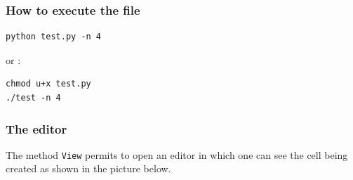 \subsubsection{How to execute the file}

\begin{verbatim}
python test.py -n 4
\end{verbatim}
\indent or :
\begin{verbatim}
chmod u+x test.py
./test -n 4
\end{verbatim}

\subsubsection{The editor}

The method \verb-View- permits to open an editor in which one can see the cell being created as shown in the picture below.
